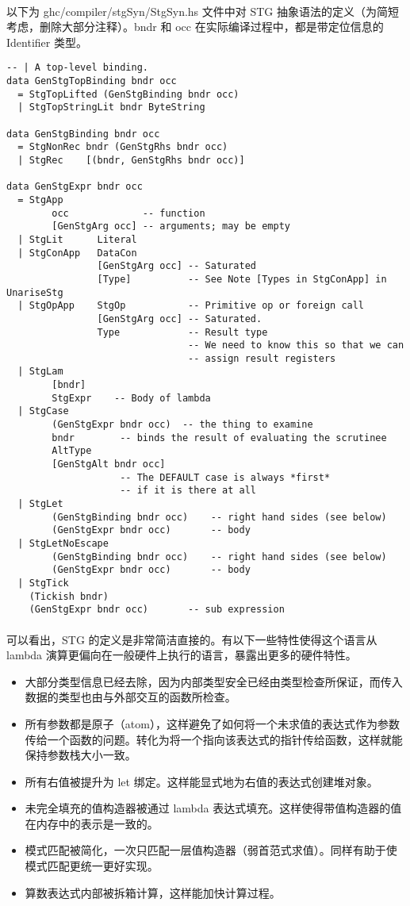 \documentclass{article}
\begin{document}
	\paragraph{}
	以下为 ghc/compiler/stgSyn/StgSyn.hs 文件中对 STG 抽象语法的定义（为简短考虑，删除大部分注释）。bndr 和 occ 在实际编译过程中，都是带定位信息的 Identifier 类型。
\begin{verbatim}
-- | A top-level binding.
data GenStgTopBinding bndr occ
  = StgTopLifted (GenStgBinding bndr occ)
  | StgTopStringLit bndr ByteString

data GenStgBinding bndr occ
  = StgNonRec bndr (GenStgRhs bndr occ)
  | StgRec    [(bndr, GenStgRhs bndr occ)]

data GenStgExpr bndr occ
  = StgApp
        occ             -- function
        [GenStgArg occ] -- arguments; may be empty
  | StgLit      Literal
  | StgConApp   DataCon
                [GenStgArg occ] -- Saturated
                [Type]          -- See Note [Types in StgConApp] in UnariseStg
  | StgOpApp    StgOp           -- Primitive op or foreign call
                [GenStgArg occ] -- Saturated.
                Type            -- Result type
                                -- We need to know this so that we can
                                -- assign result registers
  | StgLam
        [bndr]
        StgExpr    -- Body of lambda
  | StgCase
        (GenStgExpr bndr occ)  -- the thing to examine
        bndr        -- binds the result of evaluating the scrutinee
        AltType
        [GenStgAlt bndr occ]
                    -- The DEFAULT case is always *first*
                    -- if it is there at all
  | StgLet
        (GenStgBinding bndr occ)    -- right hand sides (see below)
        (GenStgExpr bndr occ)       -- body
  | StgLetNoEscape
        (GenStgBinding bndr occ)    -- right hand sides (see below)
        (GenStgExpr bndr occ)       -- body
  | StgTick
    (Tickish bndr)
    (GenStgExpr bndr occ)       -- sub expression
\end{verbatim}
	\paragraph{}
	可以看出，STG 的定义是非常简洁直接的。有以下一些特性使得这个语言从 lambda 演算更偏向在一般硬件上执行的语言，暴露出更多的硬件特性。
	\begin{itemize}
		\item 大部分类型信息已经去除，因为内部类型安全已经由类型检查所保证，而传入数据的类型也由与外部交互的函数所检查。
		\item 所有参数都是原子（atom），这样避免了如何将一个未求值的表达式作为参数传给一个函数的问题。转化为将一个指向该表达式的指针传给函数，这样就能保持参数栈大小一致。
		\item 所有右值被提升为 let 绑定。这样能显式地为右值的表达式创建堆对象。
		\item 未完全填充的值构造器被通过 lambda 表达式填充。这样使得带值构造器的值在内存中的表示是一致的。
		\item 模式匹配被简化，一次只匹配一层值构造器（弱首范式求值）。同样有助于使模式匹配更统一更好实现。
		\item 算数表达式内部被拆箱计算，这样能加快计算过程。
	\end{itemize}
\end{document}
